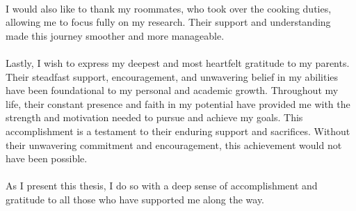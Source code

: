 \paragraph*{}I would also like to thank my roommates, who took over the cooking duties, allowing me to focus fully on my research. Their support and understanding made this journey smoother and more manageable.

\paragraph*{}Lastly, I wish to express my deepest and most heartfelt gratitude to my parents. Their steadfast support, encouragement, and unwavering belief in my abilities have been foundational to my personal and academic growth. Throughout my life, their constant presence and faith in my potential have provided me with the strength and motivation needed to pursue and achieve my goals. This accomplishment is a testament to their enduring support and sacrifices. Without their unwavering commitment and encouragement, this achievement would not have been possible.

\paragraph*{}As I present this thesis, I do so with a deep sense of accomplishment and gratitude to all those who have supported me along the way.